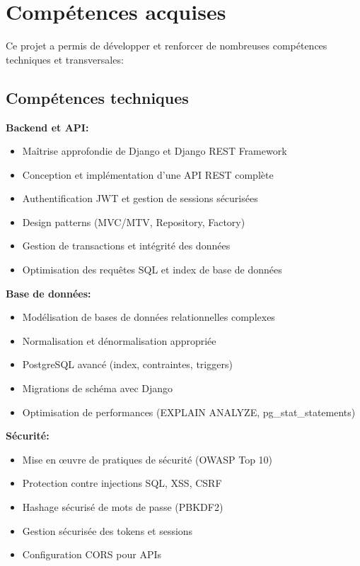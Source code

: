 \section{Compétences acquises}

Ce projet a permis de développer et renforcer de nombreuses compétences techniques et transversales:

\subsection{Compétences techniques}

\textbf{Backend et API:}
\begin{itemize}
    \item Maîtrise approfondie de Django et Django REST Framework
    \item Conception et implémentation d'une API REST complète
    \item Authentification JWT et gestion de sessions sécurisées
    \item Design patterns (MVC/MTV, Repository, Factory)
    \item Gestion de transactions et intégrité des données
    \item Optimisation des requêtes SQL et index de base de données
\end{itemize}

\textbf{Base de données:}
\begin{itemize}
    \item Modélisation de bases de données relationnelles complexes
    \item Normalisation et dénormalisation appropriée
    \item PostgreSQL avancé (index, contraintes, triggers)
    \item Migrations de schéma avec Django
    \item Optimisation de performances (EXPLAIN ANALYZE, pg\_stat\_statements)
\end{itemize}

\textbf{Sécurité:}
\begin{itemize}
    \item Mise en œuvre de pratiques de sécurité (OWASP Top 10)
    \item Protection contre injections SQL, XSS, CSRF
    \item Hashage sécurisé de mots de passe (PBKDF2)
    \item Gestion sécurisée des tokens et sessions
    \item Configuration CORS pour APIs
\end{itemize}

